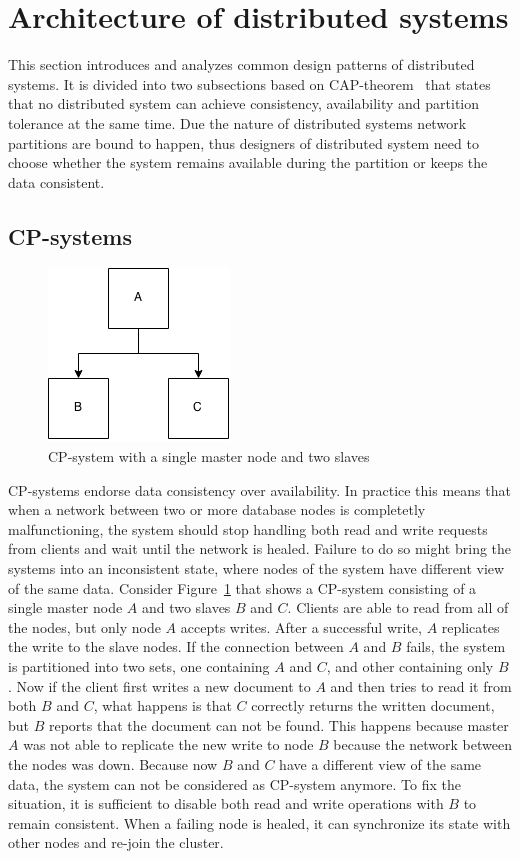 \section{Architecture of distributed systems}

This section introduces and analyzes common design patterns of distributed
systems. It is divided into two subsections based on
CAP-theorem~\cite{gilbert2002brewer} that states that no distributed system can
achieve consistency, availability and partition tolerance at the same time. Due
the nature of distributed systems network partitions are bound to happen, thus
designers of distributed system need to choose whether the system remains
available during the partition or keeps the data consistent.

\subsection{CP-systems}

\begin{figure}[h!]
  \centering
    \includegraphics{pictures/cp_system.png}
  \caption{CP-system with a single master node and two slaves}
\label{cpimage}
\end{figure}

CP-systems endorse data consistency over availability. In practice this means
that when a network between two or more database nodes is completetly
malfunctioning, the system should stop handling both read and write requests
from clients and wait until the network is healed. Failure to do so might bring
the systems into an inconsistent state, where nodes of the system have
different view of the same data. Consider Figure~\ref{cpimage} that shows a
CP-system consisting of a single master node \(A\) and two slaves \(B\) and
\(C\). Clients are able to read from all of the nodes, but only node \(A\)
accepts writes. After a successful write, \(A\) replicates the write to the
slave nodes. If the connection between \(A\) and \(B\) fails, the system is
partitioned into two sets, one containing \(A\) and \(C\), and other containing
only \(B\). Now if the client first writes a new document to \(A\) and then
tries to read it from both \(B\) and \(C\), what happens is that \(C\)
correctly returns the written document, but \(B\) reports that the document can
not be found. This happens because master \(A\) was not able to replicate the
new write to node \(B\) because the network between the nodes was down. Because
now \(B\) and \(C\) have a different view of the same data, the system can not
be considered as CP-system anymore. To fix the situation, it is sufficient to
disable both read and write operations with \(B\) to remain consistent. When a
failing node is healed, it can synchronize its state with other nodes and
re-join the cluster.

